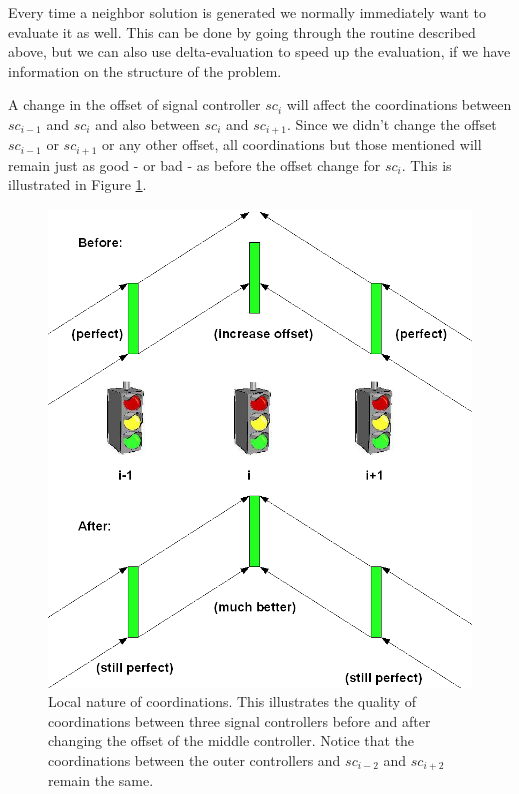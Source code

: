 Every time a neighbor solution is generated we normally immediately want to evaluate it as well. This can be done by going through the routine described above, but we can also use delta-evaluation to speed up the evaluation, if we have information on the structure of the problem.

A change in the offset of signal controller $sc_i$ will affect the coordinations between $sc_{i-1}$ and $sc_{i}$ and also between $sc_{i}$ and $sc_{i+1}$. Since we didn't change the offset $sc_{i-1}$ or $sc_{i+1}$ or any other offset, all coordinations but those mentioned will remain just as good - or bad - as before the offset change for $sc_i$. This is illustrated in Figure \ref{fig:delta_eval}.

\begin{figure}[htbp]
\centering
\includegraphics[scale=0.3]{delta_eval.png}
\caption{Local nature of coordinations. This illustrates the quality of coordinations between three signal controllers before and after changing the offset of the middle controller. Notice that the coordinations between the outer controllers and $sc_{i-2}$ and $sc_{i+2}$ remain the same.}
\label{fig:delta_eval}
\end{figure}

